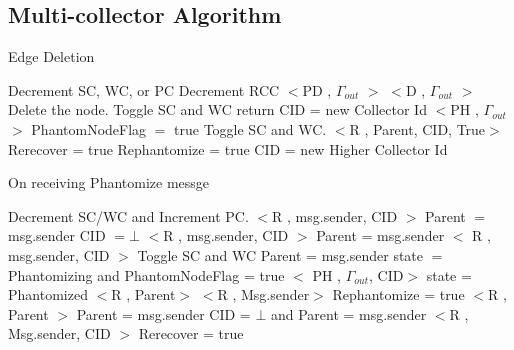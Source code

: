 \subsection{Multi-collector Algorithm}
\label{multialgo}
\begin{algorithm}[H]
\caption{Edge Deletion}
\label{Link Deletion}
\scriptsize
\begin{multicols}{2}
\begin{algorithmic}[1]
\State Decrement SC, WC, or PC
    \State Decrement RCC
  \EndIf
			\State $<$PD , $\Gamma_{out}$ $>$
			\State $<$D , $\Gamma_{out}$ $>$
			\State Delete the node.
		\EndIf
		\State Toggle SC and WC
      \State return
    \EndIf
		\State CID = new Collector Id
		\State $<$PH , $\Gamma_{out}$ $>$
		\State PhantomNodeFlag $=$ true
		\State Toggle SC and WC.
				\State $<$R , Parent, CID, True$>$
		\EndIf
			\State Rerecover = true
			\State Rephantomize = true
		\EndIf
	  \State CID = new Higher Collector Id
	\EndIf
\EndProcedure
\end{algorithmic}
\end{multicols}
\end{algorithm}	

	
\begin{algorithm}[H]
\caption{On receiving Phantomize messge}
\label{Phantom message received}
\scriptsize
\begin{multicols}{2}
\begin{algorithmic}[1]
\State Decrement SC/WC and Increment PC.
			\State $<$R , msg.sender, CID $>$
		\Else
			\State Parent $=$ msg.sender
			\State CID $= \bot$ 
		\EndIf
	\Else
		\State $<$R , msg.sender, CID $>$
	\EndIf
{}
	\State Parent = msg.sender
	\State $<$ R , msg.sender, CID $>$
	\State Toggle SC and WC
	\State Parent = msg.sender
	\State state $=$ Phantomizing and PhantomNodeFlag = true
	\State $<$ PH , $\Gamma_{out}$, CID$>$
		\State state = Phantomized
		\State $<$R , Parent$>$
	\EndIf
{}
		\State $<$R , Msg.sender$>$
	\Else
  	\State Rephantomize = true
			\State $<$R , Parent $>$
			\State Parent = msg.sender
		\Else
				\State CID = $\bot$ and Parent = msg.sender
			\Else
				\State $<$R , Msg.sender, CID $>$
				\State Rerecover = true
			\EndIf
		\EndIf
	\EndIf
\EndIf
\EndProcedure
\end{algorithmic}
\end{multicols}
\end{algorithm}	
	
